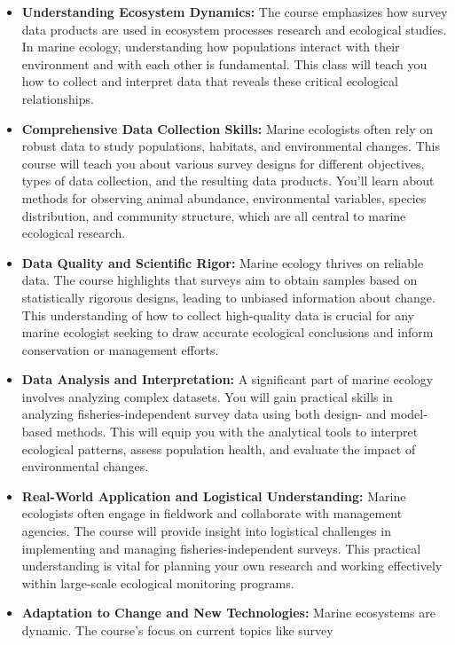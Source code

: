 \documentclass[
  letterpaper,
  oneside,
  open=any]{scrbook}
\providecommand{\tightlist}{%
  \setlength{\itemsep}{0pt}\setlength{\parskip}{0pt}}\usepackage{longtable,booktabs,array}
\begin{document}
\begin{itemize}
\tightlist
\item
  \textbf{Understanding Ecosystem Dynamics:} The course emphasizes how
  survey data products are used in ecosystem processes research and
  ecological studies. In marine ecology, understanding how populations
  interact with their environment and with each other is fundamental.
  This class will teach you how to collect and interpret data that
  reveals these critical ecological relationships.
\item
  \textbf{Comprehensive Data Collection Skills:} Marine ecologists often
  rely on robust data to study populations, habitats, and environmental
  changes. This course will teach you about various survey designs for
  different objectives, types of data collection, and the resulting data
  products. You'll learn about methods for observing animal abundance,
  environmental variables, species distribution, and community
  structure, which are all central to marine ecological research.
\item
  \textbf{Data Quality and Scientific Rigor:} Marine ecology thrives on
  reliable data. The course highlights that surveys aim to obtain
  samples based on statistically rigorous designs, leading to unbiased
  information about change. This understanding of how to collect
  high-quality data is crucial for any marine ecologist seeking to draw
  accurate ecological conclusions and inform conservation or management
  efforts.
\item
  \textbf{Data Analysis and Interpretation:} A significant part of
  marine ecology involves analyzing complex datasets. You will gain
  practical skills in analyzing fisheries-independent survey data using
  both design- and model-based methods. This will equip you with the
  analytical tools to interpret ecological patterns, assess population
  health, and evaluate the impact of environmental changes.
\item
  \textbf{Real-World Application and Logistical Understanding:} Marine
  ecologists often engage in fieldwork and collaborate with management
  agencies. The course will provide insight into logistical challenges
  in implementing and managing fisheries-independent surveys. This
  practical understanding is vital for planning your own research and
  working effectively within large-scale ecological monitoring programs.
\item
  \textbf{Adaptation to Change and New Technologies:} Marine ecosystems
  are dynamic. The course's focus on current topics like survey

\end{itemize}
\end{document}
